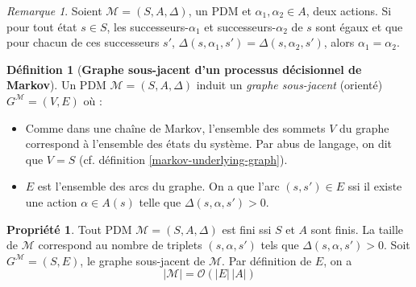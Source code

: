 \documentclass[12pt,a4paper]{report}
\theoremstyle{definition}%
\newtheorem{definition}{Définition}[chapter]
\newtheorem{propriete}{Propriété}[chapter]
\theoremstyle{remark}
\newtheorem{example}{Exemple}[chapter]
\newtheorem{remark}{Remarque}[chapter]
\newcommand{\ssi}{ssi }
\newcommand{\cf}{cf. }
\let\labelitemi\labelitemii
\begin{document}

\begin{remark}
	Soient $\mathcal{M} = (S, A, \Delta)$, un PDM et $\alpha_1, \alpha_2 \in A$,
	deux actions. Si pour tout état $s \in S$, les successeurs-$\alpha_1$ et
	successeurs-$\alpha_2$ de $s$ sont égaux et que pour chacun de ces successeurs
	$s'$, $\Delta(s, \alpha_1, s') = \Delta(s, \alpha_2, s')$, alors $\alpha_1 =
	\alpha_2$.
\end{remark}


\begin{definition}[\textbf{Graphe sous-jacent d'un processus décisionnel de Markov}]
	Un PDM $\mathcal{M} = (S, A, \Delta)$ induit un \textit{graphe sous-jacent} (orienté) $G^\mathcal{M} = (V, E)$ où :
	\begin{itemize}
		\renewcommand{\labelitemi}{\tiny $\bullet$}
		\item Comme dans une chaîne de Markov, l'ensemble des sommets $V$ du graphe correspond à l'ensemble des états du système. Par abus de langage, on dit que $V = S$ (\cf définition \ref{markov-underlying-graph}).
		\item $E$ est l'ensemble des arcs du graphe. On a que l'arc $(s, s') \in E$ \ssi il existe une action $\alpha \in A(s)$ telle que $\Delta(s, \alpha, s') > 0$.
	\end{itemize}
\end{definition}

\begin{propriete}
Tout PDM $\mathcal{M} = (S, A, \Delta)$ est fini ssi $S$ et $A$ sont finis. La taille de $\mathcal{M}$
correspond au nombre de triplets $(s, \alpha, s')$ tels que $\Delta(s, \alpha, s') > 0$. Soit $G^\mathcal{M} = (S, E)$, le graphe sous-jacent de $\mathcal{M}$. Par définition de $E$, on a
\[ |\mathcal{M}| = \mathcal{O}(|E| \, |A|) \]
\end{propriete}
\end{document}
